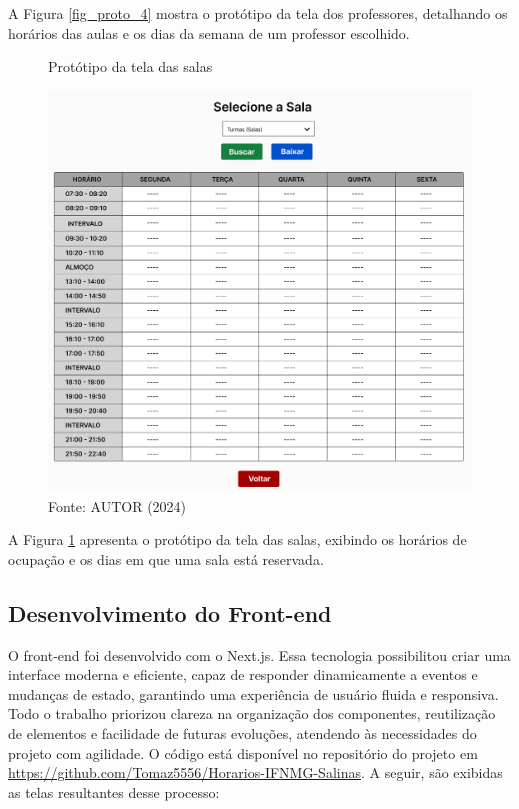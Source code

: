 A Figura \ref{fig_proto_4} mostra o protótipo da tela dos professores, detalhando os horários das aulas e os dias da semana de um professor escolhido.

\begin{figure}[H]
    \centering
    \caption{Protótipo da tela das salas}
    \includegraphics[width=1\textwidth]{Figuras/proto-5.PNG}
    \caption*{Fonte: AUTOR (2024)}
    \label{fig_proto_5}
\end{figure}

A Figura \ref{fig_proto_5} apresenta o protótipo da tela das salas, exibindo os horários de ocupação e os dias em que uma sala está reservada.

\subsection{Desenvolvimento do Front-end}

O front-end foi desenvolvido com o Next.js. Essa tecnologia possibilitou criar uma interface moderna e eficiente, capaz de responder dinamicamente a eventos e mudanças de estado, garantindo uma experiência de usuário fluida e responsiva. Todo o trabalho priorizou clareza na organização dos componentes, reutilização de elementos e facilidade de futuras evoluções, atendendo às necessidades do projeto com agilidade. O código está disponível no repositório do projeto em \url{https://github.com/Tomaz5556/Horarios-IFNMG-Salinas}. A seguir, são exibidas as telas resultantes desse processo:

